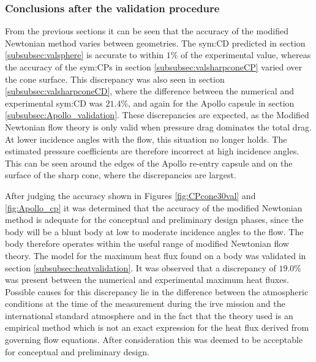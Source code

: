 \subsubsection{Conclusions after the validation procedure}
\label{subsec:validconclusions}
From the previous sections it can be seen that the accuracy of the modified Newtonian method varies between geometries. The \gls{sym:CD} predicted in section \ref{subsubsec:valsphere} is accurate to within $1\%$ of the experimental value, whereas the accuracy of the \glspl{sym:CP} in section \ref{subsubsec:valsharpconeCP} varied over the cone surface. This discrepancy was also seen in section \ref{subsubsec:valsharpconeCD}, where the difference between the numerical and experimental \gls{sym:CD} was $21.4\%$, and again for the Apollo capsule in section \ref{subsubsec:Apollo_validation}. These discrepancies are expected, as the Modified Newtonian flow theory is only valid when pressure drag dominates the total drag. At lower incidence angles with the flow, this situation no longer holds. The estimated pressure coefficients are therefore incorrect at high incidence angles. This can be seen around the edges of the Apollo re-entry capsule and on the surface of the sharp cone, where the discrepancies are largest.  

 After judging the accuracy shown in Figures \ref{fig:CPcone30val} and \ref{fig:Apollo_cp} it was determined that the accuracy of the modified Newtonian method is adequate for the conceptual and preliminary design phases, since the body will be a blunt body at low to moderate incidence angles to the flow. The body therefore operates within the useful range of modified Newtonian flow theory. 
The model for the maximum heat flux found on a body was validated in section \ref{subsubsec:heatvalidation}. It was observed that a discrepancy of $19.0\%$ was present between the numerical and experimental maximum heat fluxes. Possible causes for this discrepancy lie in the difference between the atmospheric conditions at the time of the measurement during the \gls{irve} mission and the international standard atmosphere and in the fact that the theory used is an empirical method which is not an exact expression for the heat flux derived from governing flow equations.  After consideration this was deemed to be acceptable for conceptual and preliminary design.